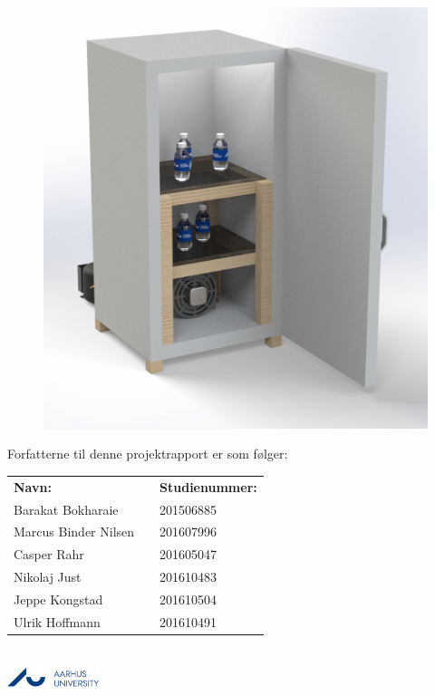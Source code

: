 \documentclass[../Hovedrapport.tex]{subfiles}
\begin{document}
    \begin{minipage}{1\textwidth}	
    \begin{figure}[H]
			\centering
			\includegraphics[width=0.55\linewidth]{Billeder/forsidebillede.png}
			\label{fig:Forsidebillede}
		\end{figure}
Forfatterne til denne projektrapport er som følger:
\begin{table}[H]
	\begin{tabular}{lll}
	\textbf{Navn:}          & &   \textbf{Studienummer:}      \\
	Barakat Bokharaie       & &   201506885                   \\
	Marcus Binder Nilsen    & &   201607996                   \\
	Casper Rahr             & &   201605047                   \\
	Nikolaj Just            & &   201610483                   \\
	Jeppe Kongstad          & &   201610504                   \\
	Ulrik Hoffmann          & &   201610491                   \\
	\end{tabular}
\end{table}
    \end{minipage} \\
    	\includegraphics[width=0.2\textwidth]{Billeder/AUlogo.JPG}
    \vfil
\end{document}
